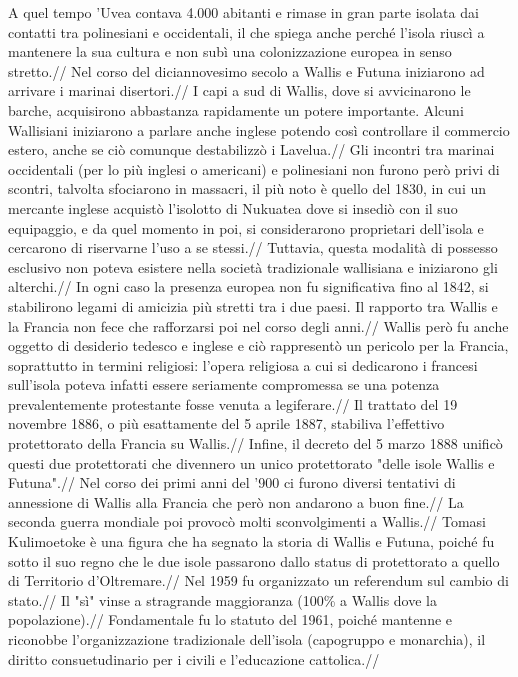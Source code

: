 \documentclass[fleqn,10pt]{SelfArx} %
\begin{document}
A quel tempo 'Uvea contava 4.000 abitanti e rimase in gran parte isolata dai contatti tra polinesiani e occidentali, il che spiega anche perché l'isola riuscì a mantenere la sua cultura e non subì una colonizzazione europea in senso stretto.//
Nel corso del diciannovesimo secolo a Wallis e Futuna iniziarono ad arrivare i marinai disertori.//
I capi a sud di Wallis, dove si avvicinarono le barche, acquisirono abbastanza rapidamente un potere importante. Alcuni Wallisiani iniziarono a parlare anche inglese potendo così controllare il commercio estero, anche se ciò comunque destabilizzò i Lavelua.//
Gli incontri tra marinai occidentali (per lo più inglesi o americani) e polinesiani non furono però privi di scontri, talvolta sfociarono in massacri, il più noto è quello del 1830, in cui un mercante inglese acquistò l'isolotto di Nukuatea dove si insediò con il suo equipaggio, e da quel momento in poi, si considerarono proprietari dell'isola e cercarono di riservarne l'uso a se stessi.//
Tuttavia, questa modalità di possesso esclusivo non poteva esistere nella società tradizionale wallisiana e iniziarono gli alterchi.//
In ogni caso la presenza europea non fu significativa fino al 1842, si stabilirono legami di amicizia più stretti tra i due paesi. Il rapporto tra Wallis e la Francia non fece che rafforzarsi poi nel corso degli anni.//
Wallis però fu anche oggetto di desiderio tedesco e inglese e ciò rappresentò un pericolo per la Francia, soprattutto in termini religiosi: l'opera religiosa a cui si dedicarono i francesi sull'isola poteva infatti essere seriamente compromessa se una potenza prevalentemente protestante fosse venuta a legiferare.//
Il trattato del 19 novembre 1886, o più esattamente del 5 aprile 1887, stabiliva l'effettivo protettorato della Francia su Wallis.//
Infine, il decreto del 5 marzo 1888 unificò questi due protettorati che divennero un unico protettorato "delle isole Wallis e Futuna".//
Nel corso dei primi anni del '900 ci furono diversi tentativi di annessione di Wallis alla Francia che però non andarono a buon fine.//
La seconda guerra mondiale poi provocò molti sconvolgimenti a Wallis.//
Tomasi Kulimoetoke è una figura che ha segnato la storia di Wallis e Futuna, poiché fu sotto il suo regno che le due isole passarono dallo status di protettorato a quello di Territorio d'Oltremare.//
Nel 1959 fu organizzato un referendum sul cambio di stato.//
Il "sì" vinse a stragrande maggioranza (100\% a Wallis dove la popolazione).//
Fondamentale fu lo statuto del 1961, poiché mantenne e riconobbe l'organizzazione tradizionale dell'isola (capogruppo e monarchia), il diritto consuetudinario per i civili e l'educazione cattolica.//
\end{document}

